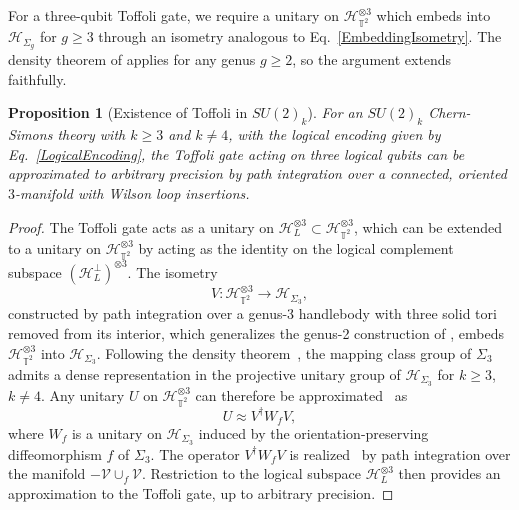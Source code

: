 \documentclass[12pt,a4paper]{article}
\newtheorem{proposition}{Proposition}
\begin{document}
For a three-qubit Toffoli gate, we require a unitary on $\mathcal{H}_{\mathbb{T}^2}^{\otimes 3}$ which embeds into $\mathcal{H}_{\Sigma_g}$ for $g \geq 3$ through an isometry analogous to Eq.\ \eqref{EmbeddingIsometry}. The density theorem of \cite{Freedman2003} applies for any genus $g \geq 2$, so the argument extends faithfully.

\begin{proposition}[Existence of Toffoli in $SU(2)_k$]\label{prop:toffoli_existence}
For an $SU(2)_k$ Chern-Simons theory with $k \geq 3$ and $k \neq 4$, with the logical encoding given by Eq.\ \eqref{LogicalEncoding}, the Toffoli gate acting on three logical qubits can be approximated to arbitrary precision by path integration over a connected, oriented $3$-manifold with Wilson loop insertions.
\end{proposition}

\begin{proof}
The Toffoli gate acts as a unitary on $\mathcal{H}_L^{\otimes 3} \subset \mathcal{H}_{\mathbb{T}^2}^{\otimes 3}$, which can be extended to a unitary on $\mathcal{H}_{\mathbb{T}^2}^{\otimes 3}$ by acting as the identity on the logical complement subspace $(\mathcal{H}_L^\perp)^{\otimes 3}$. The isometry 
%
\begin{equation}
    V: \mathcal{H}_{\mathbb{T}^2}^{\otimes 3} \to \mathcal{H}_{\Sigma_3},
\end{equation}
%
constructed by path integration over a genus-3 handlebody with three solid tori removed from its interior, which generalizes the genus-2 construction of \cite{Salton:2016qpp}, embeds $\mathcal{H}_{\mathbb{T}^2}^{\otimes 3}$ into $\mathcal{H}_{\Sigma_3}$. Following the density theorem~\cite{Freedman2003}, the mapping class group of $\Sigma_3$ admits a dense representation in the projective unitary group of $\mathcal{H}_{\Sigma_3}$ for $k \geq 3$, $k \neq 4$. Any unitary $U$ on $\mathcal{H}_{\mathbb{T}^2}^{\otimes 3}$ can therefore be approximated~\cite{Salton:2016qpp} as
%
\begin{equation}
    U \approx V^\dagger W_f V, 
\end{equation}
%
where $W_f$ is a unitary on $\mathcal{H}_{\Sigma_3}$ induced by the orientation-preserving diffeomorphism $f$ of $\Sigma_3$. The operator $V^\dagger W_f V$ is realized~\cite{Salton:2016qpp} by path integration over the manifold $-\mathcal{V} \cup_f \mathcal{V}$. Restriction to the logical subspace $\mathcal{H}_L^{\otimes 3}$ then provides an approximation to the Toffoli gate, up to arbitrary precision.
\end{proof}
\end{document}
